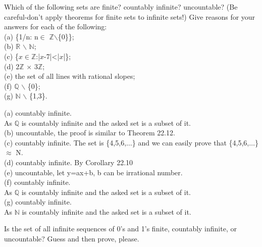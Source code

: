 \documentclass[11pt, a4paper, UTF8]{ctexart}
\begin{document}
\begin{problem}[UD:22.2]
Which of the following sets are finite? countably infinite? uncountable? (Be careful-don't apply theorems for finite sets to infinite sets!) Give reasons for your answers for each of the following:\\
(a) \{1/n: n$\in$ $\mathbb{Z}$$\backslash$\{0\}\};\\
(b) $\mathbb{R}$ $\backslash$ $\mathbb{N}$;\\
(c) \{$x\in \mathbb{Z}$:|$x$-7|<|$x$|\};\\
(d) 2$\mathbb{Z}$ $\times$ 3$\mathbb{Z}$;\\
(e) the set of all lines with rational slopes;\\
(f) $\mathbb{Q}$ $\backslash$ \{0\};\\
(g) $\mathbb{N}$ $\backslash$ \{1,3\}.
\end{problem}
\begin{solution}
(a) countably infinite.\\
As $\mathbb{Q}$ is countably infinite and the asked set is a subset of it.\\
(b) uncountable, the proof is similar to Theorem 22.12.\\
(c) countably infinite. The set is \{4,5,6,$\dots$\} and we can easily prove that \{4,5,6,$\dots$\}$\approx$ N.\\
(d) countably infinite. By Corollary 22.10\\
(e) uncountable, let y=ax+b, b can be irrational number.\\
(f) countably infinite.\\
As $\mathbb{Q}$ is countably infinite and the asked set is a subset of it.\\
(g) countably infinite.\\
As $\mathbb{N}$ is countably infinite and the asked set is a subset of it.\\
\end{solution}




\begin{problem}[UD:22.3]
Is the set of all infinite sequences of 0's and 1's finite, countably infinite, or uncountable? Guess and then prove, please.
\end{problem}
\end{document}
